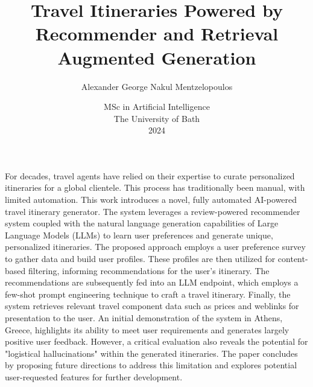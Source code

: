 \documentclass[12pt,a4paper]{report}
\title{\bf Travel Itineraries Powered by Recommender and Retrieval Augmented Generation}
\author{Alexander George Nakul Mentzelopoulos}
\date{MSc  in Artificial Intelligence\\ 
      The University of Bath\\
     2024}
\begin{document}
\hypersetup{pageanchor=false}

\lstset{language=Python,breaklines,breakatwhitespace,basicstyle=\small}

\setcounter{page}{0}

\maketitle
\newpage

\newpage

\newpage

\hypersetup{pageanchor=true}

\abstract
For decades, travel agents have relied on their expertise to curate personalized itineraries for a global clientele. This process has traditionally been manual, with limited automation. This work introduces a novel, fully automated AI-powered travel itinerary generator. The system leverages a review-powered recommender system coupled with the natural language generation capabilities of Large Language Models (LLMs) to learn user preferences and generate unique, personalized itineraries. The proposed approach employs a user preference survey to gather data and build user profiles. These profiles are then utilized for content-based filtering, informing recommendations for the user's itinerary. The recommendations are subsequently fed into an LLM endpoint, which employs a few-shot prompt engineering technique to craft a travel itinerary. Finally, the system retrieves relevant travel component data such as prices and weblinks for presentation to the user.
An initial demonstration of the system in Athens, Greece, highlights its ability to meet user requirements and generates largely positive user feedback. However, a critical evaluation also reveals the potential for "logistical hallucinations" within the generated itineraries. The paper concludes by proposing future directions to address this limitation and explores potential user-requested features for further development.

\newpage

\tableofcontents
\newpage

\listoffigures
\newpage


\end{document}

